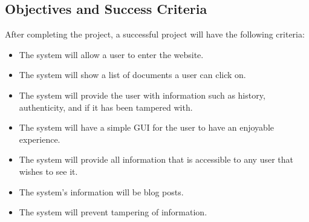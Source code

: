 \subsection{Objectives and Success Criteria} %

After completing the project, a successful project will have the following criteria:
\begin{itemize}
	\item The system will allow a user to enter the website.
	\item The system will show a list of documents a user can click on.
	\item The system will provide the user with information such as history, authenticity, and if it has been tampered with.
	\item The system will have a simple GUI for the user to have an enjoyable experience.
	\item The system will provide all information that is accessible to any user that wishes to see it.
	\item The system's information will be blog posts.
	\item The system will prevent tampering of information.
\end{itemize} %
